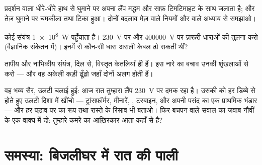 \begin{exercise}[$\star\star$]\label{exo:g9:alternator:9}
प्रदर्शन वाला  धीरे-धीरे हाथ से घुमाने पर अपना लैंप
मद्धम और साफ़ टिमटिमाहट के साथ जलाता है; और तेज़ घुमाने पर चमकीला तथा
टिका हुआ। दोनों बदलाव मेज़ वाले नियमों और  वाले अध्याय से
समझाओ।
\end{exercise}

\begin{exercise}[$\star\star$]\label{exo:g9:alternator:10}
कोई संयंत्र \qty{1e8}{W} पहुँचाता है। \qty{230}{V} पर और
\qty{400000}{V} पर ज़रूरी धाराओं की तुलना करो (वैज्ञानिक संकेतन में)।
इनमें से कौन-सी धारा असली केबल ढो सकती थीं?
\end{exercise}

\begin{exercise}[$\star\star$]\label{exo:g9:alternator:11}
तापीय और नाभिकीय संयंत्र, दिल से, विस्तृत केतलियाँ ही हैं। इस नारे का
बचाव उनकी शृंखलाओं से करो --- और वह अकेली कड़ी ढूँढ़ो जहाँ दोनों अलग
होती हैं।
\end{exercise}

\begin{exercise}[$\star\star\star$]\label{exo:g9:alternator:12}
वह भव्य सैर, उलटी चलाई हुई: आज रात तुम्हारा लैंप \qty{230}{V} पर दमक
रहा है। उसकी  को हर डिब्बे से होते हुए उलटी दिशा में खींचो ---
ट्रांसफ़ॉर्मर, मीनारें, , टरबाइन, और अपनी पसंद का एक
प्राथमिक भंडार --- और हर पड़ाव पर  का रूप तथा रास्ते के रिसाव भी
बताओ। फिर बचपन वाले सवाल का जवाब नौवीं  के एक वाक्य में दो:
तुम्हारे कमरे का  आख़िरकार आता कहाँ से है?
\end{exercise}

\section{समस्या: बिजलीघर में रात की पाली}

